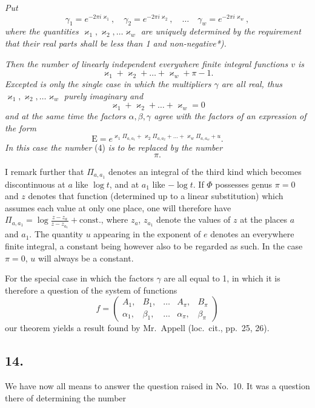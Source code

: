 \documentclass{article}
\begin{document}
\emph{Put}
\[
\gamma_1 = e^{-2\pi i\varkappa_1}, \quad \gamma_2 = e^{-2\pi i\varkappa_2}, \quad \dots \quad \gamma_w = e^{-2\pi i\varkappa_w}, \tag{3}
\]
\emph{where the quantities $\varkappa_1, \varkappa_2, \dots \varkappa_w$ are uniquely determined by the requirement that their real parts shall be less than 1 and non-negative*).}

\emph{Then the number of linearly independent everywhere finite integral functions $v$ is}
\[
\varkappa_1 + \varkappa_2 + \dots + \varkappa_w + \pi - 1. \tag{4}
\]
\emph{Excepted is only the single case in which the multipliers $\gamma$ are all real, thus $\varkappa_1, \varkappa_2, \dots \varkappa_w$ purely imaginary and}
\[
\varkappa_1 + \varkappa_2 + \dots + \varkappa_w = 0
\]
\emph{and at the same time the factors $\alpha, \beta, \gamma$ agree with the factors of an expression of the form}
\[
\mathrm{E} = e^{\varkappa_1 \Pi_{a, a_1} + \varkappa_2 \Pi_{a, a_2} + \dots + \varkappa_w \Pi_{a, a_w} + u}.
\]
\emph{In this case the number} (4) \emph{is to be replaced by the number}
\[
\pi. \tag{5}
\]

I remark further that $\Pi_{a, a_1}$ denotes an integral of the third kind which becomes discontinuous at $a$ like $\log t$, and at $a_1$ like $-\log t$. If $\Phi$ possesses genus $\pi = 0$ and $z$ denotes that function (determined up to a linear substitution) which assumes each value at only one place, one will therefore have $\Pi_{a, a_1} = \log\frac{z - z_a}{z - z_{a_1}} + \text{const.}$, where $z_a$, $z_{a_1}$ denote the values of $z$ at the places $a$ and $a_1$. The quantity $u$ appearing in the exponent of $e$ denotes an everywhere finite integral, a constant being however also to be regarded as such. In the case $\pi = 0$, $u$ will always be a constant.

For the special case in which the factors $\gamma$ are all equal to 1, in which it is therefore a question of the system of functions
\[
f = \begin{pmatrix}
A_1, & B_1, & \dots & A_\pi, & B_\pi \\
\alpha_1, & \beta_1, & \dots & \alpha_\pi, & \beta_\pi
\end{pmatrix}
\]
our theorem yields a result found by Mr.~Appell (loc.~cit., pp.~25, 26).

\subsection*{14.}

We have now all means to answer the question raised in No.~10. It was a question there of determining the number
\end{document}
